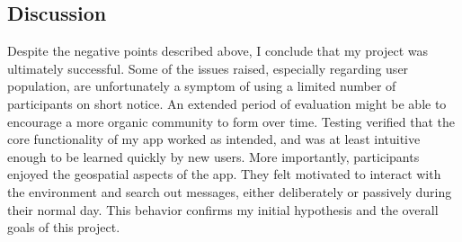 \subsection{Discussion}

Despite the negative points described above, I conclude that my project was ultimately successful. Some of the issues raised, especially regarding user population, are unfortunately a symptom of using a limited number of participants on short notice. An extended period of evaluation might be able to encourage a more organic community to form over time. Testing verified that the core functionality of my app worked as intended, and was at least intuitive enough to be learned quickly by new users. More importantly, participants enjoyed the geospatial aspects of the app. They felt motivated to interact with the environment and search out messages, either deliberately or passively during their normal day. This behavior confirms my initial hypothesis and the overall goals of this project.
